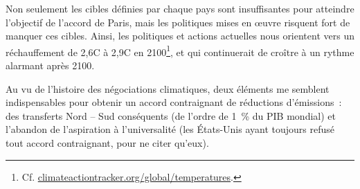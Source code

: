 \documentclass[a5paper,french]{memoir}
\begin{document}
Non seulement les cibles définies par chaque pays sont insuffisantes pour atteindre l'objectif de l'accord de Paris, mais les politiques mises en œuvre risquent fort de manquer ces cibles. Ainsi, les politiques et actions actuelles nous orientent vers un réchauffement de 2,6\textdegree{}C à 2,9\textdegree{}C en 2100\footnote{Cf. \href{https://climateactiontracker.org/global/temperatures/}{climateactiontracker.org/global/temperatures}.}, et qui continuerait de croître à un rythme alarmant après 2100. 

Au vu de l'histoire des négociations climatiques, deux éléments me semblent indispensables pour obtenir un accord contraignant de réductions d'émissions~: des transferts Nord -- Sud conséquents (de l'ordre de 1~\% du PIB mondial) et l'abandon de l'aspiration à l'universalité (les États-Unis ayant toujours refusé tout accord contraignant, pour ne citer qu'eux).
\end{document}
